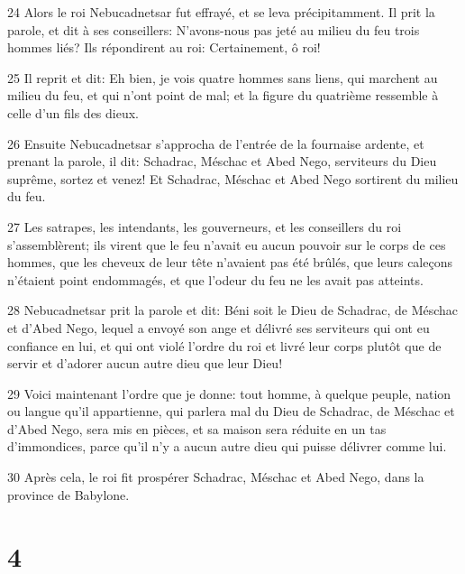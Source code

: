 \par 24 Alors le roi Nebucadnetsar fut effrayé, et se leva précipitamment. Il prit la parole, et dit à ses conseillers: N'avons-nous pas jeté au milieu du feu trois hommes liés? Ils répondirent au roi: Certainement, ô roi!
\par 25 Il reprit et dit: Eh bien, je vois quatre hommes sans liens, qui marchent au milieu du feu, et qui n'ont point de mal; et la figure du quatrième ressemble à celle d'un fils des dieux.
\par 26 Ensuite Nebucadnetsar s'approcha de l'entrée de la fournaise ardente, et prenant la parole, il dit: Schadrac, Méschac et Abed Nego, serviteurs du Dieu suprême, sortez et venez! Et Schadrac, Méschac et Abed Nego sortirent du milieu du feu.
\par 27 Les satrapes, les intendants, les gouverneurs, et les conseillers du roi s'assemblèrent; ils virent que le feu n'avait eu aucun pouvoir sur le corps de ces hommes, que les cheveux de leur tête n'avaient pas été brûlés, que leurs caleçons n'étaient point endommagés, et que l'odeur du feu ne les avait pas atteints.
\par 28 Nebucadnetsar prit la parole et dit: Béni soit le Dieu de Schadrac, de Méschac et d'Abed Nego, lequel a envoyé son ange et délivré ses serviteurs qui ont eu confiance en lui, et qui ont violé l'ordre du roi et livré leur corps plutôt que de servir et d'adorer aucun autre dieu que leur Dieu!
\par 29 Voici maintenant l'ordre que je donne: tout homme, à quelque peuple, nation ou langue qu'il appartienne, qui parlera mal du Dieu de Schadrac, de Méschac et d'Abed Nego, sera mis en pièces, et sa maison sera réduite en un tas d'immondices, parce qu'il n'y a aucun autre dieu qui puisse délivrer comme lui.
\par 30 Après cela, le roi fit prospérer Schadrac, Méschac et Abed Nego, dans la province de Babylone.

\chapter{4}

